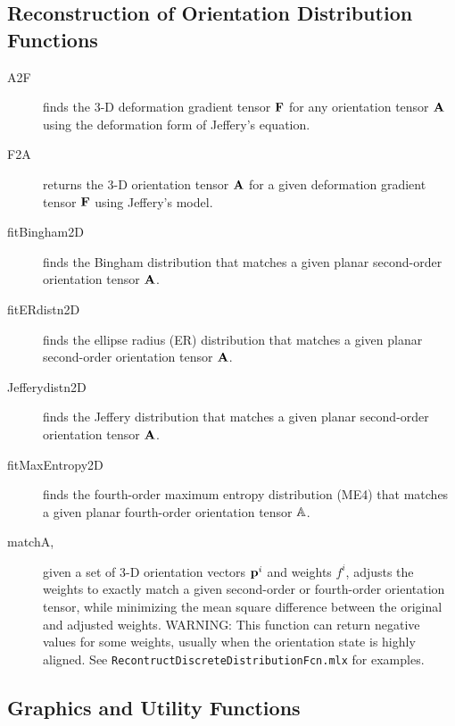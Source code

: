 \documentclass[11pt]{article}
\begin{document}
\subsection{Reconstruction of Orientation Distribution Functions}

\begin{description}

    \item[A2F]{finds the 3-D deformation gradient tensor $\mathbf{F}$ for any orientation tensor $\mathbf{A}$ using the deformation form of Jeffery's equation.}
    
    \item[F2A]{returns the 3-D orientation tensor $\mathbf{A}$ for a given deformation gradient tensor $\mathbf{F}$ using Jeffery's model.}
    
    \item[fitBingham2D]{finds the Bingham distribution that matches a given planar second-order orientation tensor $\mathbf{A}$.}
    
    \item[fitERdistn2D]{finds the ellipse radius (ER) distribution that matches a given planar second-order orientation tensor $\mathbf{A}$.}
    
    \item[Jefferydistn2D]{finds the Jeffery distribution that matches a given planar second-order orientation tensor $\mathbf{A}$.}
    
    \item[fitMaxEntropy2D]{finds the fourth-order maximum entropy distribution (ME4) that matches a given planar fourth-order orientation tensor $\mathbb{A}$.}
    
    \item[matchA,]{given a set of 3-D orientation vectors $\mathbf{p}^i$ and weights $f^i$, adjusts the weights to exactly match a given second-order or fourth-order orientation tensor, while minimizing the mean square difference between the original and adjusted weights.  WARNING: This function can return negative values for some weights, usually when the orientation state is highly aligned.  See \texttt{RecontructDiscreteDistributionFcn.mlx} for examples.}    
    
\end{description}

\subsection{Graphics and Utility Functions}
\end{document}
